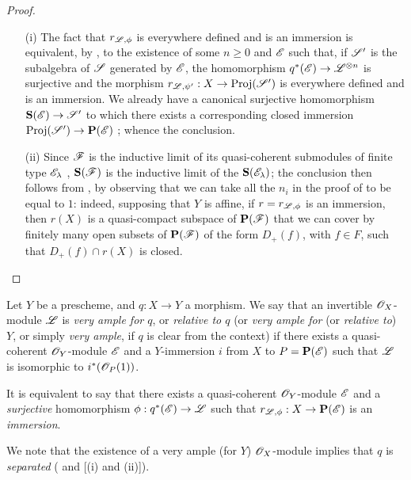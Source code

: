 \begin{proof}
\medskip\noindent
\begin{enumerate}
  \item[\rm{(i)}] The fact that $r_{\mathscr{L},\phi}$ is everywhere defined and is an immersion is equivalent, by , to the existence of some $n\geq0$ and $\mathscr{E}$ such that, if $\mathscr{S}'$ is the subalgebra of $\mathscr{S}$ generated by $\mathscr{E}$, the homomorphism $q^*(\sh{E})\to\sh{L}^{\otimes n}$ is surjective and the morphism $r_{\sh{L},\psi'}:X\to\Proj(\sh{S}')$ is everywhere defined and is an immersion.
    We already have a canonical surjective homomorphism $\bb{S}(\sh{E})\to\sh{S}'$ to which there exists a corresponding closed immersion $\Proj(\sh{S}')\to\bb{P}(\sh{E})$ ;
    whence the conclusion.
  \item[\rm{(ii)}] Since $\mathscr{F}$ is the inductive limit of its quasi-coherent submodules of finite type $\mathscr{E}_\lambda$ , $\mathbf{S}(\mathscr{F})$ is the inductive limit of the $\mathbf{S}(\mathscr{E}_\lambda)$;
    the conclusion then follows from , by observing that we can take all the $n_i$ in the proof of  to be equal to $1$:
    indeed, supposing that $Y$ is affine, if $r=r_{\mathscr{L},\phi}$ is an immersion, then $r(X)$ is a quasi-compact subspace of $\mathbf{P}(\mathscr{F})$ that we can cover by finitely many open subsets of $\mathbf{P}(\mathscr{F})$ of the form $D_+(f)$, with $f\in F$, such that $D_+(f)\cap r(X)$ is closed.
\end{enumerate}
\end{proof}

\begin{definition}[4.4.2]
\label{II.4.4.2}
Let $Y$ be a prescheme, and $q:X\to Y$ a morphism.
We say that an invertible $\mathscr{O}_X$-module $\mathscr{L}$ is \emph{very ample for $q$}, or \emph{relative to $q$} (or \emph{very ample for} (or \emph{relative to}) \emph{$Y$}, or simply \emph{very ample}, if $q$ is clear from the context) if there exists a quasi-coherent $\mathscr{O}_Y$-module $\mathscr{E}$ and a $Y$-immersion $i$ from $X$ to $P=\mathbf{P}(\mathscr{E})$ such that $\mathscr{L}$ is isomorphic to $i^*(\mathscr{O}_P(1))$.
\end{definition}

It is equivalent  to say that there exists a quasi-coherent $\mathscr{O}_Y$-module $\mathscr{E}$ and a \emph{surjective} homomorphism $\vphi:q^*(\sh{E})\to\sh{L}$ such that $r_{\sh{L},\vphi}:X\to\bb{P}(\sh{E})$ is an \emph{immersion}.

We note that the existence of a very ample (for $Y$) $\mathscr{O}_X$-module implies that $q$ is \emph{separated} ( and [(i) and (ii)]).

